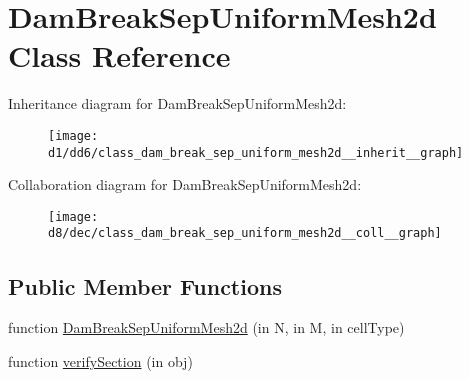 \hypertarget{class_dam_break_sep_uniform_mesh2d}{}\section{Dam\+Break\+Sep\+Uniform\+Mesh2d Class Reference}
\label{class_dam_break_sep_uniform_mesh2d}


Inheritance diagram for Dam\+Break\+Sep\+Uniform\+Mesh2d\+:
\nopagebreak
\begin{figure}[H]
\begin{center}
\leavevmode
\texttt{[image: d1/dd6/class\_dam\_break\_sep\_uniform\_mesh2d\_\_inherit\_\_graph]}
\end{center}
\end{figure}


Collaboration diagram for Dam\+Break\+Sep\+Uniform\+Mesh2d\+:
\nopagebreak
\begin{figure}[H]
\begin{center}
\leavevmode
\texttt{[image: d8/dec/class\_dam\_break\_sep\_uniform\_mesh2d\_\_coll\_\_graph]}
\end{center}
\end{figure}
\subsection*{Public Member Functions}
\begin{DoxyCompactItemize}
\item 
function \hyperlink{class_dam_break_sep_uniform_mesh2d_af09855a72b3512967646eb644c97cae7}{Dam\+Break\+Sep\+Uniform\+Mesh2d} (in N, in M, in cell\+Type)
\item 
function \hyperlink{class_dam_break_sep_uniform_mesh2d_a10b4919bed688e3411e3cea967cf7a4b}{verify\+Section} (in obj)
\end{DoxyCompactItemize}
